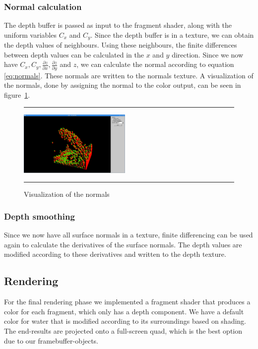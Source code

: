 \subsubsection{Normal calculation}
The depth buffer is passed as input to the fragment shader, along with the uniform variables $C_x$ and $C_y$.
Since the depth buffer is in a texture, we can obtain the depth values of neighbours.
Using these neighbours, the finite differences between depth values can be calculated in the $x$ and $y$ direction.
Since we now have $C_x, C_y, \frac{\partial z}{\partial x}, \frac{\partial z}{\partial y}$ and $z$, we can calculate the normal according to equation \ref{eq:normals}.
These normals are written to the normals texture.
A visualization of the normals, done by assigning the normal to the color output, can be seen in figure~\ref{fig:normals}. 

\begin{figure}[!th]
\hrule
\begin{center}
\vspace*{2ex}\includegraphics[width=0.48\textwidth]{pictures/normal_mapping.png}
\end{center}
\caption{Visualization of the normals}
\label{fig:normals} 
\vspace*{2ex}
\hrule
\end{figure}

\subsubsection{Depth smoothing}
Since we now have all surface normals in a texture, finite differencing can be used again to calculate the derivatives of the surface normals.
The depth values are modified according to these derivatives and written to the depth texture.

\subsection{Rendering}
For the final rendering phase we implemented a fragment shader that produces a color for each fragment, which only has a depth component.
We have a default color for water that is modified according to its surroundings based on shading. 
The end-results are projected onto a full-screen quad, which is the best option due to our framebuffer-objects.

